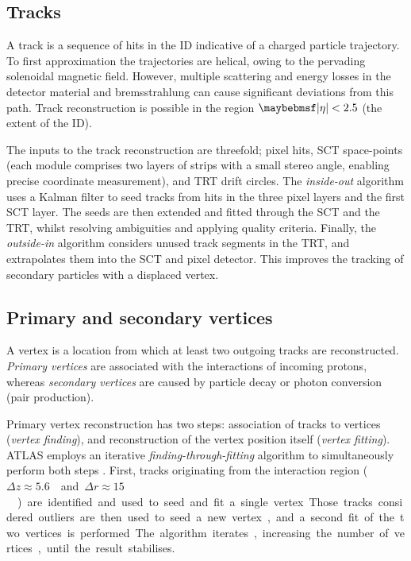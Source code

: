 
\subsection{Tracks}
\label{sec:objects:tracks}

A track is a sequence of hits in the \ac{ID} indicative of a charged particle trajectory. 
To first approximation the trajectories are helical, owing to the pervading solenoidal 
magnetic field. However, multiple scattering and energy losses in the detector material 
and bremsstrahlung can cause significant deviations from this path. Track reconstruction 
is possible in the region $\mods{\eta} < 2.5$ (the extent of the \ac{ID}).

The inputs to the track reconstruction are threefold; pixel hits, \acs{SCT} space-points 
(each module comprises two layers of strips with a small stereo angle, enabling precise 
coordinate measurement), and \acs{TRT} drift circles. The \textit{inside-out} algorithm 
\cite{Tracking,ATLAS:ExpectPerf} uses a Kalman filter to seed tracks from hits in the 
three pixel layers and the first \acs{SCT} layer. The seeds are then extended and fitted 
through the \acs{SCT} and the \acs{TRT}, whilst resolving ambiguities and applying 
quality criteria. Finally, the \textit{outside-in} algorithm \cite{Tracking} considers 
unused track segments in the \acs{TRT}, and extrapolates them into the \acs{SCT} and 
pixel detector. This improves the tracking of secondary particles with a displaced vertex.



\subsection{Primary and secondary vertices}
\label{sec:objects:vertices}

A vertex is a location from which at least two outgoing tracks are reconstructed. 
\textit{Primary vertices} are associated with the interactions of incoming protons, 
whereas \textit{secondary vertices} are caused by particle decay or photon conversion
(\epluseminus pair production).

Primary vertex reconstruction has two steps: association of tracks to vertices 
(\textit{vertex finding}), and reconstruction of the vertex position itself 
(\textit{vertex fitting}). ATLAS employs an iterative \textit{finding-through-fitting} 
algorithm to simultaneously perform both steps \cite{PrimVertexFinding,AllVertexFinding}.
First, tracks originating from the interaction region 
(\unit{$\Delta z \approx 5.6$}{\centi\metre} and 
\unit{$\Delta r \approx 15$}{\micro\metre}) are identified and used to seed and fit a 
single vertex. Those tracks considered outliers are then used to seed a new vertex, and a 
second fit of the two vertices is performed. The algorithm iterates, increasing the 
number of vertices, until the result stabilises.

